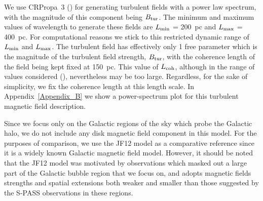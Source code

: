 \documentclass[usenatbib]{mnras}
\begin{document}
We use CRPropa~3 (\cite{CRPropa3_2016}) for generating turbulent fields with a power law spectrum, with the magnitude of this component being $B_{\rm{tur}}$. 
The minimum and maximum values of wavelength to generate these fields are  $L_{\rm min}$ = 200~pc and $L_{\rm max}$ = 400~pc. For computational reasons we stick to this restricted dynamic range of $L_{\rm min}$ and $L_{\rm max}$. The turbulent field has effectively only 1 free parameter which is the magnitude of the turbulent field strength, $ B_{\rm tur}$, with the coherence length of the field being kept fixed at 150~pc. This value of $L_{\rm coh}$, although in the range of values considered (\cite{Ohno_1993, Chepurnov_2010, Haverkorn_2013, Giacinti_2018}), nevertheless may be too large. Regardless, for the sake of simplicity, we fix the coherence length at this length scale. In Appendix~\ref{Appendix_B} we show a power-spectrum plot for this turbulent magnetic field description.

Since we focus only on the Galactic regions of the sky which probe the Galactic halo, we do not include any disk magnetic field component in this model. For the purposes of comparison, we use the JF12 model as a comparative reference since it is a widely known Galactic magnetic field model.
However, it should be noted that the JF12 model was motivated by observations which masked out a large part of the Galactic bubble region that we focus on, and adopts magnetic fields strengths and spatial extensions both weaker and smaller than those suggested by the S-PASS observations \citep{Carretti_2013} in these regions.
\end{document}
